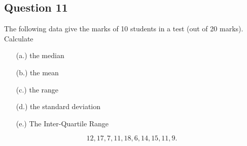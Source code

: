 \documentclass[a4paper,12pt]{article}
\begin{document}
\subsection*{Question 11}

The following data give the marks of 10 students in a test (out of 20 marks). Calculate
\begin{itemize}   
\item[(a.)] the median    
\item[(b.)] the mean     
\item[(c.)] the range    
\item[(d.)] the standard deviation 
\item[(e.)] The Inter-Quartile Range
\end{itemize}

\[12, 17, 7, 11, 18, 6, 14, 15, 11, 9.\]
\end{document}
